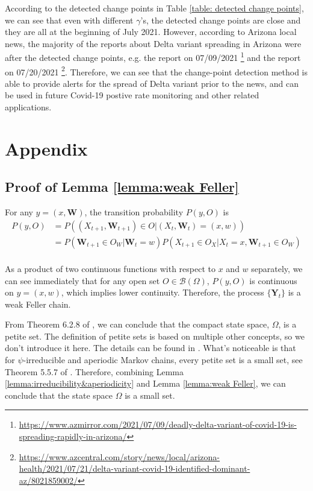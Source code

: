 \documentclass{article}
\theoremstyle{definition}
\begin{document}
According to the detected change points in Table \ref{table: detected change points}, we can see that even with different $\gamma$'s, the detected change points are close and they are all at the beginning of July 2021. However, according to Arizona local news, the majority of the reports about Delta variant spreading in Arizona were after the detected change points, e.g. the report on 07/09/2021 \footnote{\url{https://www.azmirror.com/2021/07/09/deadly-delta-variant-of-covid-19-is-spreading-rapidly-in-arizona/}} and the report on 07/20/2021 \footnote{\url{https://www.azcentral.com/story/news/local/arizona-health/2021/07/21/delta-variant-covid-19-identified-dominant-az/8021859002/}}. Therefore, we can see that the change-point detection method is able to provide alerts for the spread of Delta variant prior to the news, and can be used in future Covid-19 postive rate monitoring and other related applications. 
\newpage
\section{Appendix}

\subsection{Proof of Lemma \ref{lemma:weak Feller}}
\label{app: weak feller chain}


For any $y = (x,\bm{W})$, the transition probability $P(y,O)$ is
\begin{equation}
\label{eq: decompose transition probability}
    \begin{aligned}
    P(y,O) &= P((X_{t+1},\bm{W}_{t+1}) \in O|(X_t,\bm{W}_t) = (x,w)) \\
    & = P(\bm{W}_{t+1} \in O_W|\bm{W}_t = w)P(X_{t+1} \in O_X|X_t = x, \bm{W}_{t+1} \in O_W) \\
    \end{aligned}
\end{equation}


As a product of two continuous functions with respect to $x$ and $w$ separately, we can see immediately that for any open set $O \in \mathcal{B}(\Omega)$, $P(y,O)$ is continuous on $y = (x,w)$, which implies lower continuity. Therefore, the process $\{\bm{Y}_t\}$ is a weak Feller chain. 

From Theorem 6.2.8 of \cite{meyn1993markov}, we can conclude that the compact state space, $\Omega$, is a petite set. The definition of petite sets is based on multiple other concepts, so we don't introduce it here. The details can be found in \cite{meyn1993markov}. What's noticeable is that for $\psi$-irreducible and aperiodic Markov chains, every petite set is a small set, see Theorem 5.5.7 of \cite{meyn1993markov}. Therefore, combining Lemma \ref{lemma:irreducibility&aperiodicity} and Lemma \ref{lemma:weak Feller}, we can conclude that the state space $\Omega$ is a small set. 
\end{document}
